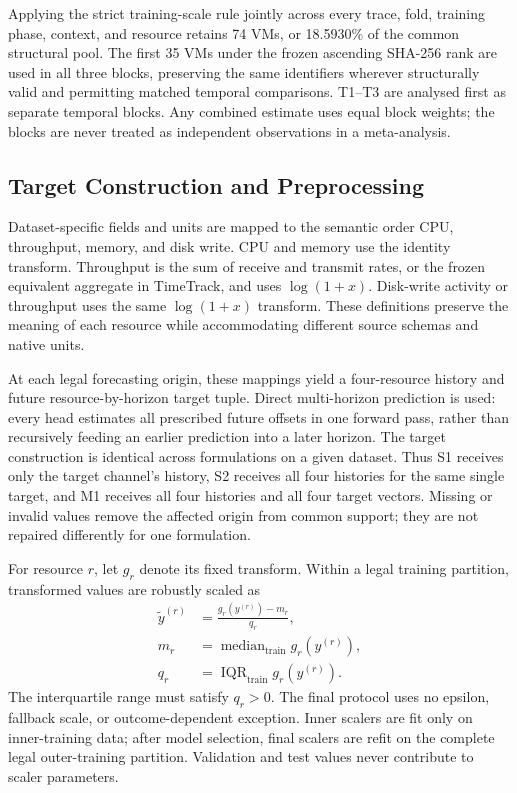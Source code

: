 \documentclass[a4paper,fleqn]{cas-dc}
\begin{document}
Applying the strict training-scale rule jointly across every trace, fold, training phase,
context, and resource retains 74 VMs, or 18.5930\% of the common structural
pool.  The first 35 VMs under the frozen ascending SHA-256 rank are used in all
three blocks, preserving the same identifiers wherever structurally valid and
permitting matched temporal comparisons.  T1--T3 are analysed first as
separate temporal blocks.  Any combined estimate uses equal block weights;
the blocks are never treated as independent observations in a meta-analysis.



\subsection{Target Construction and Preprocessing}
\label{sec:preprocessing}

Dataset-specific fields and units are mapped to the semantic order CPU,
throughput, memory, and disk write.  CPU and memory use the identity transform.
Throughput is the sum of receive and transmit rates, or the frozen equivalent
aggregate in TimeTrack, and uses $\log(1+x)$.  Disk-write activity or throughput
uses the same $\log(1+x)$ transform.  These definitions preserve the meaning of
each resource while accommodating different source schemas and native units.

At each legal forecasting origin, these mappings yield a four-resource history
and future resource-by-horizon target tuple.  Direct multi-horizon prediction is
used: every head estimates all prescribed future offsets in one forward pass,
rather than recursively feeding an earlier prediction into a later horizon.
The target construction is identical across formulations on a given dataset.
Thus S1 receives only the target channel's history, S2 receives all four
histories for the same single target, and M1 receives all four histories and
all four target vectors.  Missing or invalid values remove the affected origin
from common support; they are not repaired differently for one formulation.

For resource $r$, let $g_r$ denote its fixed transform.  Within a legal
training partition, transformed values are robustly scaled as
\begin{equation}
  \begin{aligned}
    \widetilde{y}^{(r)}
      &= \frac{g_r(y^{(r)})-m_r}{q_r}, \\
    m_r &= \operatorname{median}_{\mathrm{train}} g_r(y^{(r)}), \\
    q_r &= \operatorname{IQR}_{\mathrm{train}} g_r(y^{(r)}).
  \end{aligned}
  \label{eq:robust-scaling}
\end{equation}
The interquartile range must satisfy $q_r>0$.  The final protocol uses no
epsilon, fallback scale, or outcome-dependent exception.  Inner scalers are fit
only on inner-training data; after model selection, final scalers are refit on
the complete legal outer-training partition.  Validation and test values never
contribute to scaler parameters.
\end{document}
